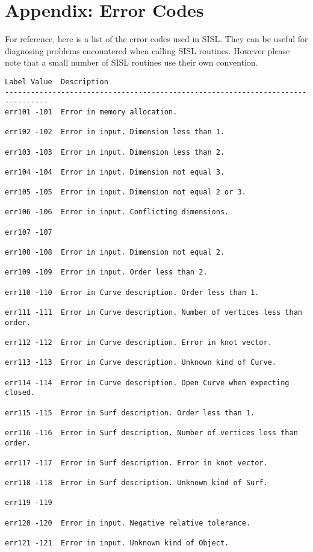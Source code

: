 \chapter{Appendix: Error Codes}
\label{errorcodes}
For reference, here is a list of the error codes used in SISL.
They can be useful for diagnosing problems encountered
when calling SISL routines.
However please note that a small number of SISL routines
use their own convention.

\begin{verbatim}
Label Value  Description
--------------------------------------------------------------------------------
err101 -101  Error in memory allocation.

err102 -102  Error in input. Dimension less than 1.

err103 -103  Error in input. Dimension less than 2.

err104 -104  Error in input. Dimension not equal 3.

err105 -105  Error in input. Dimension not equal 2 or 3.

err106 -106  Error in input. Conflicting dimensions.

err107 -107  			

err108 -108  Error in input. Dimension not equal 2.

err109 -109  Error in input. Order less than 2.

err110 -110  Error in Curve description. Order less than 1.

err111 -111  Error in Curve description. Number of vertices less than order.

err112 -112  Error in Curve description. Error in knot vector.

err113 -113  Error in Curve description. Unknown kind of Curve.

err114 -114  Error in Curve description. Open Curve when expecting closed.

err115 -115  Error in Surf description. Order less than 1.

err116 -116  Error in Surf description. Number of vertices less than order.

err117 -117  Error in Surf description. Error in knot vector.

err118 -118  Error in Surf description. Unknown kind of Surf.

err119 -119

err120 -120  Error in input. Negative relative tolerance.

err121 -121  Error in input. Unknown kind of Object.


\end{verbatim}
